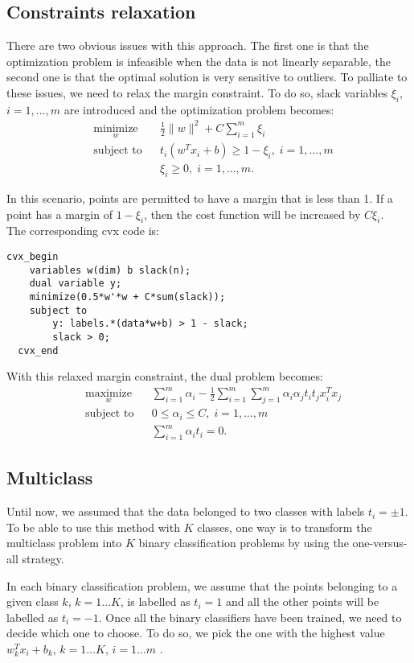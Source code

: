 \subsection{Constraints relaxation}
There are two obvious issues with this approach. The first one is that the optimization problem is infeasible when the data is not linearly separable, the second one is that the optimal solution is very sensitive to outliers. To palliate to these issues, we need to relax the margin constraint. To do so, slack variables $\xi_i$, $i=1,...,m$ are introduced and the optimization problem becomes:
\begin{equation*}
\begin{aligned}
& \underset{w}{\text{minimize}}
& & \frac{1}{2}\|w\|^2 + C\sum\limits_{i=1}^m \xi_i\\
& \text{subject to}
& & t_i(w^Tx_i+b) \geq 1-\xi_i, \; i = 1, \ldots, m\\
& & & \xi_i \geq 0, \; i = 1, \ldots, m.
\end{aligned}
\end{equation*}

In this scenario, points are permitted to have a margin that is less than 1. If a point has a margin of $1 - \xi_i$, then the cost function will be increased by $C\xi_i$. 
\\The corresponding cvx code is:
\begin{verbatim}
cvx_begin
    variables w(dim) b slack(n);
    dual variable y;
    minimize(0.5*w'*w + C*sum(slack));
    subject to 
  	    y: labels.*(data*w+b) > 1 - slack; 
        slack > 0;
  cvx_end
\end{verbatim}
With this relaxed margin constraint, the dual problem becomes:
\begin{equation*}
\begin{aligned}
& \underset{w}{\text{maximize}}
& & \sum\limits_{i=1}^m \alpha_i - \frac{1}{2} \sum\limits_{i=1}^m \sum\limits_{j=1}^m \alpha_i \alpha_j t_i t_j x_i^T x_j \\
& \text{subject to}
& & 0 \leq \alpha_i \leq C, \; i = 1, \ldots, m \\
& & & \sum\limits_{i=1}^m \alpha_i t_i = 0.
\end{aligned}
\end{equation*}

\subsection{Multiclass}
Until now, we assumed that the data belonged to two classes with labels $t_i=\pm1$. To be able to use this method with $K$ classes, one way is to transform the multiclass problem into  $K$ binary classification problems by using the one-versus-all strategy. 

In each binary classification problem, we assume that the points belonging to a given class $k$, $k=1\ldots K$, is labelled as $t_i=1$ and all the other points will be labelled as $t_i=-1$. Once all the binary classifiers have been trained, we need to decide which one to choose. To do so, we pick the one with the highest value $w_k^Tx_i+b_k$, $k=1\ldots K$, $i=1\ldots m$ . 